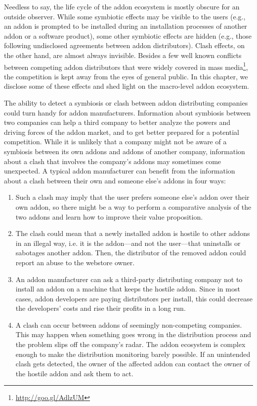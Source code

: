 \documentclass[ijoc,nonblindrev]{informs3} %
\numberwithin{equation}{subsection}
\begin{document}
Needless to say, the life cycle of the addon ecosystem is mostly obscure for an outside observer. While some symbiotic effects may be visible to the users (e.g., an addon is prompted to be installed during an installation processes of another addon or a software product), some other symbiotic effects are hidden (e.g., those following undisclosed agreements between addon distributors). Clash effects, on the other hand, are almost always invisible. Besides a few well known conflicts between competing addon distributors that were widely covered in mass media\footnote{\url{http://goo.gl/AdlzUM}}, the competition is kept away from the eyes of general public. In this chapter, we disclose some of these effects and shed light on the macro-level addon ecosystem. 

The ability to detect a symbiosis or clash between addon distributing companies could turn handy for addon manufacturers. Information about symbiosis between two companies can help a third company to better analyze the powers and driving forces of the addon market, and to get better prepared for a potential competition. While it is unlikely that a company might not be aware of a symbiosis between its own addons and addons of another company, information about a clash that involves the company's addons may sometimes come unexpected. A typical addon manufacturer can benefit from the information about a clash between their own and someone else's addons in four ways:
\begin{enumerate}
\item Such a clash may imply that the user prefers someone else's addon over their own addon, so there might be a way to perform a comparative analysis of the two addons and learn how to improve their value proposition.
\item The clash could mean that a newly installed addon is hostile to other addons in an illegal way, i.e. it is the addon---and not the user---that uninstalls or sabotages another addon. Then, the distributor of the removed addon could report an abuse to the webstore owner.
\item An addon manufacturer can ask a third-party distributing company not to install an addon on a machine that keeps the hostile addon. Since in most cases, addon developers are paying distributors per install, this could decrease the developers' costs and rise their profits in a long run.
\item A clash can occur between addons of seemingly non-competing companies. This may happen when something goes wrong in the distribution process and the problem slips off the company's radar. The addon ecosystem is complex enough to make the distribution monitoring barely possible. If an unintended clash gets detected, the owner of the affected addon can contact the owner of the hostile addon and ask them to act.
\end{enumerate}
\end{document}
